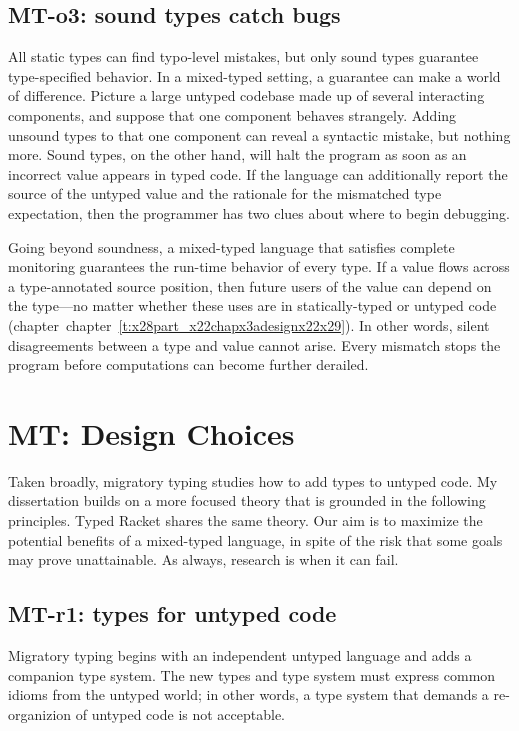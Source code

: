 \documentclass[ twoside,open=right,titlepage,numbers=noenddot,headinclude,%
                footinclude=true,cleardoublepage=empty,abstract=off,
                BCOR=5mm,paper=a4,fontsize=11pt,%
                ngerman,american,%
                parts,pdfspacing]{scrreprt}
\newcommand{\ChapRef}[2]{\SecRef{#1}{#2}}
\newcommand{\SecRef}[2]{section~#1}
\newcommand{\ChapRefLocal}[3]{\hyperref[#1]{\ChapRef{#2}{#3}}}
\let\SOriginalthesubsubsection\thesubsubsection
\newcommand{\Ssubsection}[2]{\subsection[#1]{#2}\let\thesubsubsection\SOriginalthesubsubsection}
\newcommand{\Ssubsubsection}[2]{\subsubsection[#1]{#2}}
\renewcommand{\Ssubsection}[2]{\section[#1]{#2}}
\renewcommand{\Ssubsubsection}[2]{\subsection[#1]{#2}}
\renewcommand{\ChapRefLocal}[3]{chapter~\ref{#1}}
\begin{document}
\Ssubsubsection{MT{-}o3: sound types catch bugs}{MT{-}o3: sound types catch bugs}\label{t:x28part_x22whyx3amtx2do3x22x29}

All static types can find typo{-}level mistakes, but only sound types
 guarantee type{-}specified behavior.
In a mixed{-}typed setting, a guarantee can make a world of difference.
Picture a large untyped codebase made up of several interacting components,
 and suppose that one component behaves strangely.
Adding unsound types to that one component can reveal a syntactic mistake, but nothing more.
Sound types, on the other hand, will halt the program as soon as an incorrect
 value appears in typed code.
If the language can additionally report the source of the untyped value
 and the rationale for the mismatched type expectation, then the programmer
 has two clues about where to begin debugging.

Going beyond soundness, a mixed{-}typed language that satisfies complete
 monitoring guarantees the run{-}time behavior of every type.
If a value flows across a type{-}annotated source position, then future users
 of the value can depend on the type{---}no matter whether these uses are in
 statically{-}typed or untyped code (chapter~\ChapRefLocal{t:x28part_x22chapx3adesignx22x29}{4}{Design Analysis Method}).
In other words, silent disagreements between a type and value cannot arise.
Every mismatch stops the program before computations can become further derailed.

\Ssubsection{MT: Design Choices}{MT: Design Choices}\label{t:x28part_x22secx3awhyx3adecisionsx22x29}

Taken broadly, migratory typing studies how to add types to untyped code.
My dissertation builds on a more focused theory that is grounded in the
 following principles.
Typed Racket shares the same theory.
Our aim is to maximize the potential benefits of a mixed{-}typed language,
 in spite of the risk that some goals may prove unattainable.
As always, research is when it can fail.

\Ssubsubsection{MT{-}r1: types for untyped code}{MT{-}r1: types for untyped code}\label{t:x28part_x22whyx3amtx2dr1x22x29}

Migratory typing begins with an independent untyped language and adds
 a companion type system.
The new types and type system must express common idioms from the untyped world;
 in other words, a type system that demands a re{-}organizion of untyped code
 is not acceptable.
\end{document}
